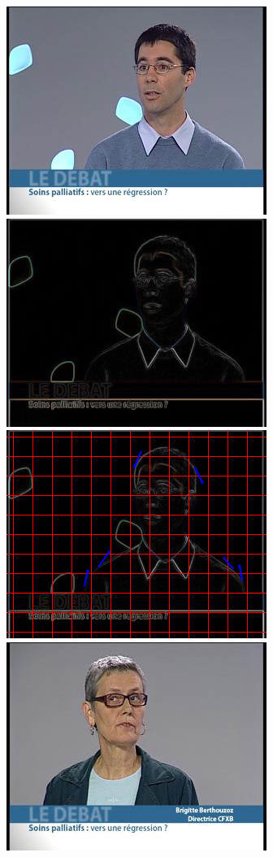 \documentclass{book}
\begin{document}
\begin{figure}[H]
\begin{center}
\includegraphics[scale=0.3]{hog_exemple.jpg}
\includegraphics[scale=0.3]{hog_exemple_contour.jpg}
\includegraphics[scale=0.3]{hog_exemple_gradient.jpg}
\includegraphics[scale=0.3]{hog_exemple2.jpg}

\end{center}
\end{figure}
\end{document}
